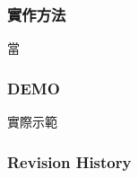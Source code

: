 \documentclass[utf8x]{beamer}
\begin{document}
\begin{frame}[t]
\frametitle{\LARGE 實作方法} %
\hspace{2em} \Large 當
\end{frame}
\begin{frame}
\frametitle{\LARGE DEMO} %
\hspace{2em} \centerline{\Large 實際示範}
\end{frame}
\begin{frame}[t]
\frametitle{\huge Revision History} %
\end{frame}
\end{document}
